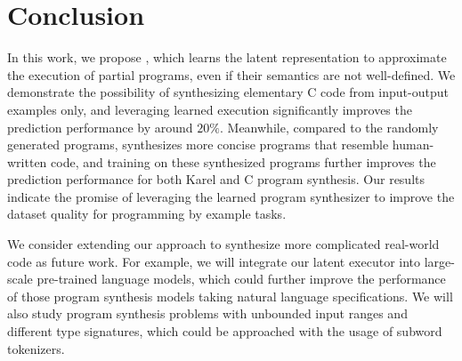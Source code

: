\section{Conclusion}
\label{sec:conc}
\vspace{-0.1in}
In this work, we propose \ours{}, which learns the latent representation to approximate the execution of partial programs, even if their semantics are not well-defined. We demonstrate the possibility of synthesizing elementary C code from input-output examples only, and leveraging learned execution significantly improves the prediction performance by around $20\%$. Meanwhile, compared to the randomly generated programs, \ours{} synthesizes more concise programs that resemble human-written code, and training on these synthesized programs further improves the prediction performance for both Karel and C program synthesis. Our results indicate the promise of leveraging the learned program synthesizer to improve the dataset quality for programming by example tasks.

We consider extending our approach to synthesize more complicated real-world code as future work. For example, we will integrate our latent executor into large-scale pre-trained language models, which could further improve the performance of those program synthesis models taking natural language specifications. We will also study program synthesis problems with unbounded input ranges and different type signatures, which could be approached with the usage of subword tokenizers.
